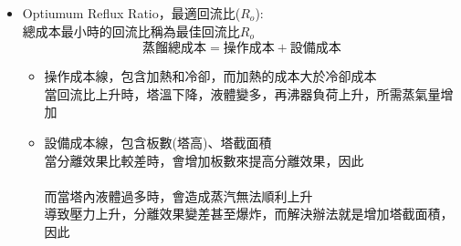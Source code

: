 \documentclass[../main.tex]{subfiles}
\begin{document}
\begin{itemize}
\begin{itemize}
\begin{itemize}
\begin{figure}[H]
        \caption{莫非效率值示意圖}
      \end{figure}
      \begin{equation}
        \eta_{M} = \frac{y_{n+1} - y_n}{y_n^\ast - y_n}
        = \frac{\text{實際每板提升的輕成分摩爾分率}}{\text{理論每板可提升的輕成分摩爾分率}}
      \end{equation}
      \item Overall efficiency (總效率) $\eta_{O}$:\\
      定義為:
      \begin{equation}
        \eta_{O} = \frac{N_{\text{min}}}{N_{\text{實際}}} =\frac{\text{最少理論板數}}{\text{實際所需板數}}
      \end{equation}
    \end{itemize}
    \item Optiumum Reflux Ratio，最適回流比($R_o$):\\
    總成本最小時的回流比稱為最佳回流比$R_o$
    \begin{equation}
      \text{蒸餾總成本} = \text{操作成本} + \text{設備成本}
    \end{equation}
    \begin{itemize}
      \item 操作成本線，包含加熱和冷卻，而加熱的成本大於冷卻成本\\
      當回流比上升時，塔溫下降，液體變多，再沸器負荷上升，所需蒸氣量增加\\
      \item 設備成本線，包含板數(塔高)、塔截面積\\
      當分離效果比較差時，會增加板數來提高分離效果，因此\\
      \\
      而當塔內液體過多時，會造成蒸汽無法順利上升\\
      導致壓力上升，分離效果變差甚至爆炸，而解決辦法就是增加塔截面積，因此\\
    \end{itemize}
    \begin{figure}[H]

\end{figure}
\end{itemize}
\end{itemize}
\end{document}
